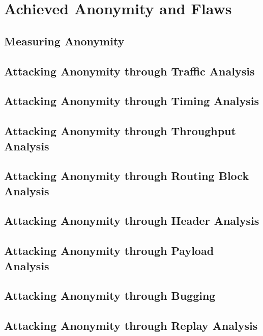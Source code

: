 \section{Achieved Anonymity and Flaws}

\subsection{Measuring Anonymity}

\subsection{Attacking Anonymity through Traffic Analysis}

\subsection{Attacking Anonymity through Timing Analysis}

\subsection{Attacking Anonymity through Throughput Analysis}

\subsection{Attacking Anonymity through Routing Block Analysis}

\subsection{Attacking Anonymity through Header Analysis}

\subsection{Attacking Anonymity through Payload Analysis}

\subsection{Attacking Anonymity through Bugging}

\subsection{Attacking Anonymity through Replay Analysis}

